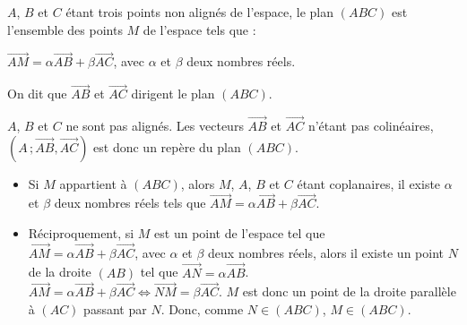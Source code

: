 \documentclass{cornouaille}
\begin{document}
\pagebreak

\begin{propriete}[Caractéristique]
  \begin{minipage}{.45\linewidth}
    $A$, $B$ et $C$ étant trois points non alignés de l'espace, le
    plan $(ABC)$ est l'ensemble des points $M$ de l'espace tels que :

    $\overrightarrow{AM}=\alpha\overrightarrow{AB}+\beta\overrightarrow{AC}$,
    avec $\alpha$ et $\beta$ deux nombres réels.

    On dit que $\overrightarrow{AB}$ et $\overrightarrow{AC}$ dirigent
    le plan $(ABC)$.
  \end{minipage}\quad
  \begin{minipage}{.45\linewidth}
  \end{minipage}
\end{propriete}


\begin{preuve}
  $A$, $B$ et $C$ ne sont pas alignés. Les vecteurs
  $\overrightarrow{AB}$ et $ \overrightarrow{AC}$ n'étant pas
  colinéaires, $(A\,;\overrightarrow{AB},\overrightarrow{AC})$ est donc
  un repère du plan $(ABC)$.
  \begin{itemize}
  \item Si $M$ appartient à $(ABC)$, alors $M$, $A$, $B$ et $C$ étant
    coplanaires, il existe $\alpha$ et $\beta$ deux nombres réels tels
    que
    $\overrightarrow{AM}=\alpha\overrightarrow{AB}+\beta\overrightarrow{AC}$.
  \item Réciproquement, si $M$ est un point de l'espace tel que \\
    $\overrightarrow{AM}=\alpha\overrightarrow{AB}+\beta\overrightarrow{AC}$,
    avec $\alpha$ et $\beta$ deux nombres réels, alors il existe un
    point $N$
    de la droite $(AB)$ tel que $\overrightarrow{AN}=\alpha\overrightarrow{AB}$.\\
    $\overrightarrow{AM}=\alpha\overrightarrow{AB}+\beta\overrightarrow{AC}\Leftrightarrow
    \overrightarrow{NM}=\beta\overrightarrow{AC}$.
    $M$ est donc un point de la droite parallèle à $(AC)$ passant par
    $N$. Donc, comme $N\in(ABC)$, $M\in(ABC)$.
  \end{itemize}
\end{preuve}
\end{document}
